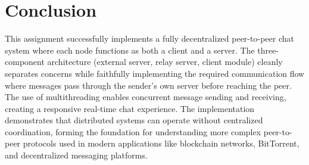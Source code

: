 \documentclass[11pt]{article}
\begin{document}
\section{Conclusion}

This assignment successfully implements a fully decentralized peer-to-peer chat system where each node functions as both a client and a server. The three-component architecture (external server, relay server, client module) cleanly separates concerns while faithfully implementing the required communication flow where messages pass through the sender's own server before reaching the peer. The use of multithreading enables concurrent message sending and receiving, creating a responsive real-time chat experience. The implementation demonstrates that distributed systems can operate without centralized coordination, forming the foundation for understanding more complex peer-to-peer protocols used in modern applications like blockchain networks, BitTorrent, and decentralized messaging platforms.
\end{document}
